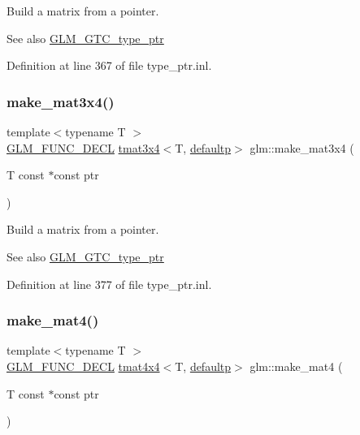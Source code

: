 Build a matrix from a pointer. \begin{DoxySeeAlso}{See also}
\mbox{\hyperlink{group__gtc__type__ptr}{G\+L\+M\+\_\+\+G\+T\+C\+\_\+type\+\_\+ptr}} 
\end{DoxySeeAlso}


Definition at line 367 of file type\+\_\+ptr.\+inl.

\mbox{\label{group__gtc__type__ptr_gac083edd180ab4d4b817acc60c516209b}} 
\subsubsection{\texorpdfstring{make\_mat3x4()}{make\_mat3x4()}}
{\footnotesize\ttfamily template$<$typename T $>$ \\
\mbox{\hyperlink{setup_8hpp_ab2d052de21a70539923e9bcbf6e83a51}{G\+L\+M\+\_\+\+F\+U\+N\+C\+\_\+\+D\+E\+CL}} \mbox{\hyperlink{structglm_1_1tmat3x4}{tmat3x4}}$<$T, \mbox{\hyperlink{namespaceglm_a0f04f086094c747d227af4425893f545a9d21ccd8b5a009ec7eb7677befc3bf51}{defaultp}}$>$ glm\+::make\+\_\+mat3x4 (\begin{DoxyParamCaption}\item[{T const $\ast$const}]{ptr }\end{DoxyParamCaption})}

Build a matrix from a pointer. \begin{DoxySeeAlso}{See also}
\mbox{\hyperlink{group__gtc__type__ptr}{G\+L\+M\+\_\+\+G\+T\+C\+\_\+type\+\_\+ptr}} 
\end{DoxySeeAlso}


Definition at line 377 of file type\+\_\+ptr.\+inl.

\mbox{\label{group__gtc__type__ptr_ga2c6e6d457cb932e1ce683e4f690a6f60}} 
\subsubsection{\texorpdfstring{make\_mat4()}{make\_mat4()}}
{\footnotesize\ttfamily template$<$typename T $>$ \\
\mbox{\hyperlink{setup_8hpp_ab2d052de21a70539923e9bcbf6e83a51}{G\+L\+M\+\_\+\+F\+U\+N\+C\+\_\+\+D\+E\+CL}} \mbox{\hyperlink{structglm_1_1tmat4x4}{tmat4x4}}$<$T, \mbox{\hyperlink{namespaceglm_a0f04f086094c747d227af4425893f545a9d21ccd8b5a009ec7eb7677befc3bf51}{defaultp}}$>$ glm\+::make\+\_\+mat4 (\begin{DoxyParamCaption}\item[{T const $\ast$const}]{ptr }\end{DoxyParamCaption})}

